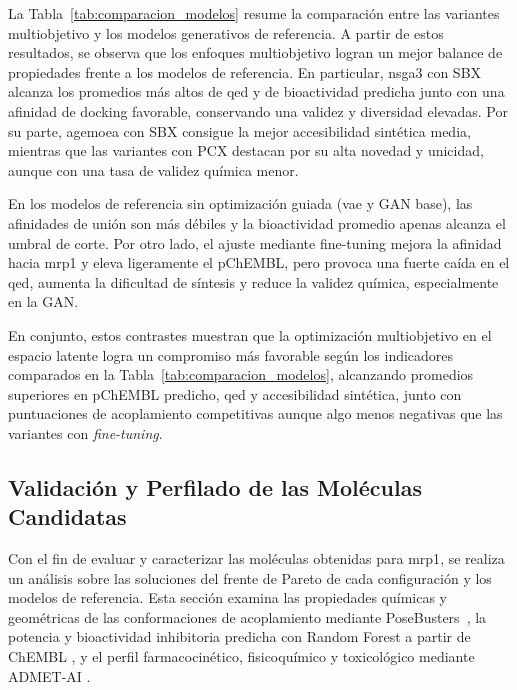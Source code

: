 La Tabla~\ref{tab:comparacion_modelos} resume la comparación entre las variantes multiobjetivo y los modelos generativos de referencia. A partir de estos resultados, se observa que los enfoques multiobjetivo logran un mejor balance de propiedades frente a los modelos de referencia. En particular, \acrshort{nsga3} con SBX alcanza los promedios más altos de \gls{qed} y de bioactividad predicha junto con una afinidad de docking favorable, conservando una validez y diversidad elevadas. Por su parte, \acrshort{agemoea} con SBX consigue la mejor accesibilidad sintética media, mientras que las variantes con PCX destacan por su alta novedad y unicidad, aunque con una tasa de validez química menor.



En los modelos de referencia sin optimización guiada (\gls{vae} y GAN base), las afinidades de unión son más débiles y la bioactividad promedio apenas alcanza el umbral de corte. Por otro lado, el ajuste mediante fine-tuning mejora la afinidad hacia \gls{mrp1} y eleva ligeramente el pChEMBL, pero provoca una fuerte caída en el \gls{qed}, aumenta la dificultad de síntesis y reduce la validez química, especialmente en la GAN.

En conjunto, estos contrastes muestran que la optimización multiobjetivo en el espacio latente logra un compromiso más favorable según los indicadores comparados en la Tabla~\ref{tab:comparacion_modelos}, alcanzando promedios superiores en pChEMBL predicho, \gls{qed} y accesibilidad sintética, junto con puntuaciones de acoplamiento competitivas aunque algo menos negativas que las variantes con \textit{fine-tuning}.

\subsection{Validación y Perfilado de las Moléculas Candidatas}
\label{subsec:mejores_moleculas}
\label{sec:validacion_perfilado}

Con el fin de evaluar y caracterizar las moléculas obtenidas para \gls{mrp1}, se realiza un análisis sobre las soluciones del frente de Pareto de cada configuración y los modelos de referencia. Esta sección examina las propiedades químicas y geométricas de las conformaciones de acoplamiento mediante PoseBusters~\cite{buttenschoen2024posebusters}, la potencia y bioactividad inhibitoria predicha con Random Forest a partir de ChEMBL \cite{mendez2019chembl}, y el perfil farmacocinético, fisicoquímico y toxicológico mediante ADMET-AI \cite{swanson2024admetai}.

